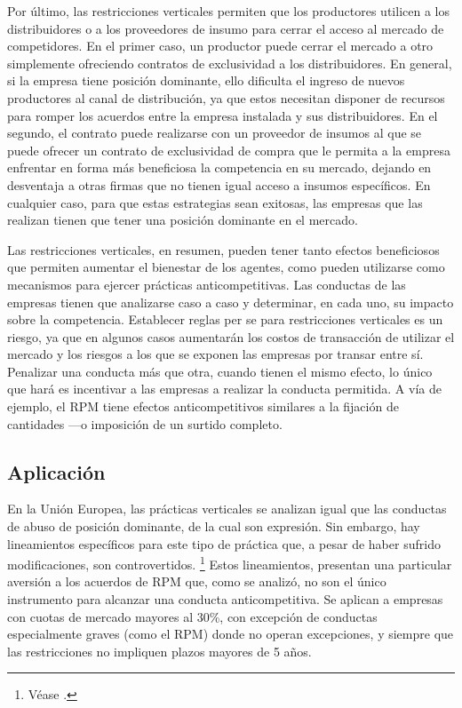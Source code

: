 \documentclass[
  12pt,
  spanish,
]{book}
\begin{document}
Por último, las restricciones verticales permiten que los productores
utilicen a los distribuidores o a los proveedores de insumo para cerrar
el acceso al mercado de competidores. En el primer caso, un productor
puede cerrar el mercado a otro simplemente ofreciendo contratos de
exclusividad a los distribuidores. En general, si la empresa tiene
posición dominante, ello dificulta el ingreso de nuevos productores al
canal de distribución, ya que estos necesitan disponer de recursos para
romper los acuerdos entre la empresa instalada y sus distribuidores. En
el segundo, el contrato puede realizarse con un proveedor de insumos al
que se puede ofrecer un contrato de exclusividad de compra que le
permita a la empresa enfrentar en forma más beneficiosa la competencia
en su mercado, dejando en desventaja a otras firmas que no tienen igual
acceso a insumos específicos. En cualquier caso, para que estas
estrategias sean exitosas, las empresas que las realizan tienen que
tener una posición dominante en el mercado.

Las restricciones verticales, en resumen, pueden tener tanto efectos
beneficiosos que permiten aumentar el bienestar de los agentes, como
pueden utilizarse como mecanismos para ejercer prácticas
anticompetitivas. Las conductas de las empresas tienen que analizarse
caso a caso y determinar, en cada uno, su impacto sobre la competencia.
Establecer reglas per se para restricciones verticales es un riesgo, ya
que en algunos casos aumentarán los costos de transacción de utilizar el
mercado y los riesgos a los que se exponen las empresas por transar
entre sí. Penalizar una conducta más que otra, cuando tienen el mismo
efecto, lo único que hará es incentivar a las empresas a realizar la
conducta permitida. A vía de ejemplo, el RPM tiene efectos
anticompetitivos similares a la fijación de cantidades ---o imposición
de un surtido completo.

\hypertarget{aplicaciuxf3n-1}{%
\subsection{Aplicación}\label{aplicaciuxf3n-1}}

En la Unión Europea, las prácticas verticales se analizan igual que las
conductas de abuso de posición dominante, de la cual son expresión. Sin
embargo, hay lineamientos específicos para este tipo de práctica que, a
pesar de haber sufrido modificaciones, son controvertidos. \footnote{Véase
  \citet{UE2010}.} Estos lineamientos, presentan una particular aversión
a los acuerdos de RPM que, como se analizó, no son el único instrumento
para alcanzar una conducta anticompetitiva. Se aplican a empresas con
cuotas de mercado mayores al 30\%, con excepción de conductas
especialmente graves (como el RPM) donde no operan excepciones, y
siempre que las restricciones no impliquen plazos mayores de 5 años.
\end{document}
